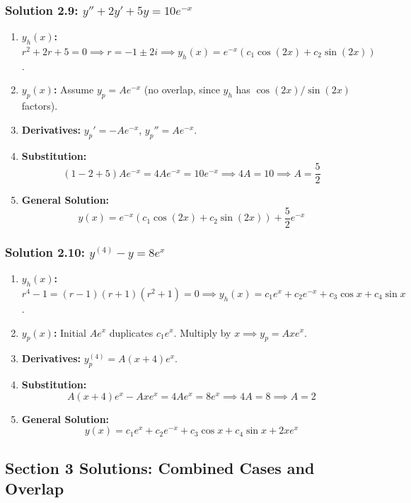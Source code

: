 \documentclass[11pt,letterpaper]{article}
\begin{document}
\subsubsection*{Solution 2.9: $y'' + 2y' + 5y = 10 e^{-x}$}
\begin{enumerate}
    \item \textbf{$y_h(x)$:} $r^2 + 2r + 5 = 0 \implies r = -1 \pm 2i \implies y_h(x) = e^{-x}(c_1 \cos(2x) + c_2 \sin(2x))$.
    \item \textbf{$y_p(x)$:} Assume $y_p = A e^{-x}$ (no overlap, since $y_h$ has $\cos(2x)/\sin(2x)$ factors).
    \item \textbf{Derivatives:} $y_p' = -A e^{-x}$, $y_p'' = A e^{-x}$.
    \item \textbf{Substitution:}
    \[ (1 - 2 + 5) A e^{-x} = 4 A e^{-x} = 10 e^{-x} \implies 4A = 10 \implies A = \frac{5}{2} \]
    \item \textbf{General Solution:}
    \[ y(x) = e^{-x}(c_1 \cos(2x) + c_2 \sin(2x)) + \frac{5}{2}e^{-x} \]
\end{enumerate}

\subsubsection*{Solution 2.10: $y^{(4)} - y = 8 e^x$}
\begin{enumerate}
    \item \textbf{$y_h(x)$:} $r^4 - 1 = (r-1)(r+1)(r^2+1) = 0 \implies y_h(x) = c_1 e^x + c_2 e^{-x} + c_3 \cos x + c_4 \sin x$.
    \item \textbf{$y_p(x)$:} Initial $A e^x$ duplicates $c_1 e^x$. Multiply by $x \implies y_p = A x e^x$.
    \item \textbf{Derivatives:} $y_p^{(4)} = A(x + 4)e^x$.
    \item \textbf{Substitution:}
    \[ A(x + 4)e^x - A x e^x = 4 A e^x = 8 e^x \implies 4A = 8 \implies A = 2 \]
    \item \textbf{General Solution:}
    \[ y(x) = c_1 e^x + c_2 e^{-x} + c_3 \cos x + c_4 \sin x + 2x e^x \]
\end{enumerate}

\newpage
\subsection*{Section 3 Solutions: Combined Cases and Overlap}
\end{document}
